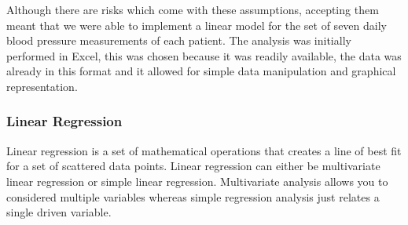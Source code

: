 \documentclass[11pt]{article}
\begin{document}
Although there are risks which come with these assumptions, accepting them meant that we were able to implement a linear model for the set of seven daily blood pressure measurements of each patient. The analysis was initially performed in Excel, this was chosen because it was readily available, the data was already in this format and it allowed for simple data manipulation and graphical representation.

\subsubsection{Linear Regression}
Linear regression is a set of mathematical operations that creates a line of best fit for a set of scattered data points. Linear regression can either be multivariate linear regression or simple linear regression. Multivariate analysis allows you to considered multiple variables whereas simple regression analysis just relates a single driven variable. 
\end{document}
